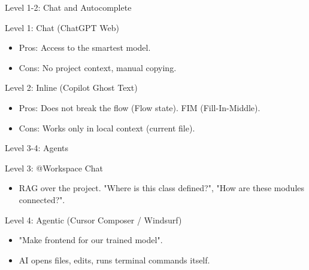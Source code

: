 \documentclass[aspectratio=169]{beamer}
\begin{document}
\begin{frame}[t]{Level 1-2: Chat and Autocomplete}
    \begin{block}{Level 1: Chat (ChatGPT Web)}
        \begin{itemize}
            \item Pros: Access to the smartest model.
            \item Cons: No project context, manual copying.
        \end{itemize}
    \end{block}
    \begin{block}{Level 2: Inline (Copilot Ghost Text)}
        \begin{itemize}
            \item Pros: Does not break the flow (Flow state). FIM (Fill-In-Middle).
            \item Cons: Works only in local context (current file).
        \end{itemize}
    \end{block}
\end{frame}

\begin{frame}[t]{Level 3-4: Agents}
    \begin{block}{Level 3: @Workspace Chat}
        \begin{itemize}
            \item RAG over the project. "Where is this class defined?", "How are these modules connected?".
        \end{itemize}
    \end{block}
    \begin{block}{Level 4: Agentic (Cursor Composer / Windsurf)}
        \begin{itemize}
            \item "Make frontend for our trained model".
            \item AI opens files, edits, runs terminal commands itself.
        \end{itemize}
    \end{block}
\end{frame}
\end{document}
